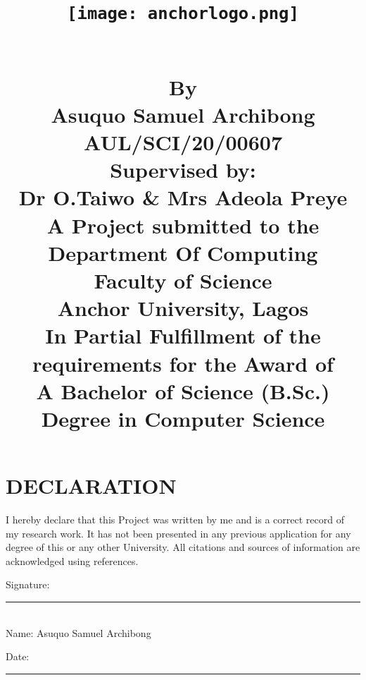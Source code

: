 \documentclass[12pt, twoside]{report}
\begin{document}
	
	\title{
		\begin{center}
			{\texttt{[image: anchorlogo.png]}}
		\end{center}
		\vspace{0.5cm}
		{\large }\\
		\vspace{0.1cm}
		{\large By}\\
		\vspace{0.1cm}
		{\large Asuquo Samuel Archibong}\\	
		\vspace{0.1cm}
		{\large AUL/SCI/20/00607}\\
		\vspace{0.1cm}
		{\large Supervised by:}\\	
		\vspace{0.1cm}
		{\large Dr O.Taiwo \& Mrs Adeola Preye}\\
		\vspace{0.1cm}
		{\large A Project submitted to the Department Of Computing}\\
		\vspace{0.1cm}
		{\large Faculty of Science}\\
		\vspace{0.1cm}
		{\large Anchor University, Lagos}\\
		\vspace{0.1cm}
		{\large In Partial Fulfillment of the requirements for the Award of}\\
		\vspace{0.1cm}
		{\large A Bachelor of Science (B.Sc.) Degree in Computer Science}
	}
	
	\maketitle
	
	\pagestyle{empty}
	
	\chapter*{DECLARATION}
	I hereby declare that this Project was written by me and is a correct record of my research work. It has not been presented in any previous application for any degree of this or any other University. All citations and sources of information are acknowledged using references.	\\
	\begin{flushleft}
		\vspace{1cm}
		{Signature: \rule{5cm}{0.4pt}}\\
		\vspace{0.5cm}
		{Name: Asuquo Samuel Archibong}\\
		\vspace{0.5cm}
		{Date: \rule{5cm}{0.4pt}}\\
		\vspace{0.5cm}
	\end{flushleft}
	
\end{document}
